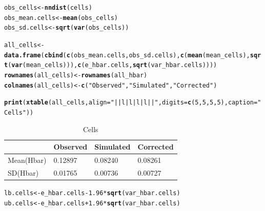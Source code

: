 \documentclass{article}\usepackage[]{graphicx}\usepackage[]{color}
\makeatletter
\newcommand{\hlnum}[1]{\textcolor[rgb]{0.686,0.059,0.569}{#1}}%
\newcommand{\hlstr}[1]{\textcolor[rgb]{0.192,0.494,0.8}{#1}}%
\newcommand{\hlopt}[1]{\textcolor[rgb]{0,0,0}{#1}}%
\newcommand{\hlstd}[1]{\textcolor[rgb]{0.345,0.345,0.345}{#1}}%
\newcommand{\hlkwb}[1]{\textcolor[rgb]{0.69,0.353,0.396}{#1}}%
\newcommand{\hlkwc}[1]{\textcolor[rgb]{0.333,0.667,0.333}{#1}}%
\newcommand{\hlkwd}[1]{\textcolor[rgb]{0.737,0.353,0.396}{\textbf{#1}}}%
\newenvironment{kframe}{%
 \def\at@end@of@kframe{}%
 \ifinner\ifhmode%
  \def\at@end@of@kframe{\end{minipage}}%
  \begin{minipage}{\columnwidth}%
 \fi\fi%
 \def\FrameCommand##1{\hskip\@totalleftmargin \hskip-\fboxsep
 \colorbox{shadecolor}{##1}\hskip-\fboxsep
     \hskip-\linewidth \hskip-\@totalleftmargin \hskip\columnwidth}%
 \MakeFramed {\advance\hsize-\width
   \@totalleftmargin\z@ \linewidth\hsize
   \@setminipage}}%
 {\par\unskip\endMakeFramed%
 \at@end@of@kframe}
\newenvironment{knitrout}{}{} %
\makeatother
\begin{document}
\begin{enumerate}
\begin{enumerate}
\begin{knitrout}
\end{knitrout}

\begin{kframe}
\begin{alltt}
\hlstd{obs_cells} \hlkwb{<-} \hlkwd{nndist}\hlstd{(cells)}
\hlstd{obs_mean.cells} \hlkwb{<-} \hlkwd{mean}\hlstd{(obs_cells)}
\hlstd{obs_sd.cells} \hlkwb{<-} \hlkwd{sqrt}\hlstd{(}\hlkwd{var}\hlstd{(obs_cells))}

\hlstd{all_cells} \hlkwb{<-} \hlkwd{data.frame}\hlstd{(}\hlkwd{cbind}\hlstd{(}\hlkwd{c}\hlstd{(obs_mean.cells,obs_sd.cells),}\hlkwd{c}\hlstd{(}\hlkwd{mean}\hlstd{(mean_cells),} \hlkwd{sqrt}\hlstd{(}\hlkwd{var}\hlstd{(mean_cells))),} \hlkwd{c}\hlstd{(e_hbar.cells,}\hlkwd{sqrt}\hlstd{(var_hbar.cells))))}
\hlkwd{rownames}\hlstd{(all_cells)} \hlkwb{<-} \hlkwd{rownames}\hlstd{(all_hbar)}
\hlkwd{colnames}\hlstd{(all_cells)} \hlkwb{<-} \hlkwd{c}\hlstd{(}\hlstr{"Observed"}\hlstd{,} \hlstr{"Simulated"}\hlstd{,} \hlstr{"Corrected"}\hlstd{)}

\hlkwd{print}\hlstd{(}\hlkwd{xtable}\hlstd{(all_cells,} \hlkwc{align} \hlstd{=} \hlstr{"||l|l|l|l||"}\hlstd{,} \hlkwc{digits} \hlstd{=} \hlkwd{c}\hlstd{(}\hlnum{5}\hlstd{,}\hlnum{5}\hlstd{,}\hlnum{5}\hlstd{,}\hlnum{5}\hlstd{),} \hlkwc{caption} \hlstd{=} \hlstr{"Cells"}\hlstd{))}
\end{alltt}
\end{kframe}%
\begin{table}[ht]
\centering
\begin{tabular}{||l|l|l|l||}
  \hline
 & Observed & Simulated & Corrected \\ 
  \hline
Mean(Hbar) & 0.12897 & 0.08240 & 0.08261 \\ 
  SD(Hbar) & 0.01765 & 0.00736 & 0.00727 \\ 
   \hline
\end{tabular}
\caption{Cells} 
\end{table}


\begin{knitrout}\footnotesize
{}\color{fgcolor}\begin{kframe}
\begin{alltt}
\hlstd{lb.cells} \hlkwb{<-} \hlstd{e_hbar.cells} \hlopt{-} \hlnum{1.96}\hlopt{*}\hlkwd{sqrt}\hlstd{(var_hbar.cells)}
\hlstd{ub.cells} \hlkwb{<-} \hlstd{e_hbar.cells} \hlopt{+} \hlnum{1.96}\hlopt{*}\hlkwd{sqrt}\hlstd{(var_hbar.cells)}
\end{alltt}
\end{kframe}
\end{knitrout}


\end{enumerate}
\end{enumerate}
\end{document}
